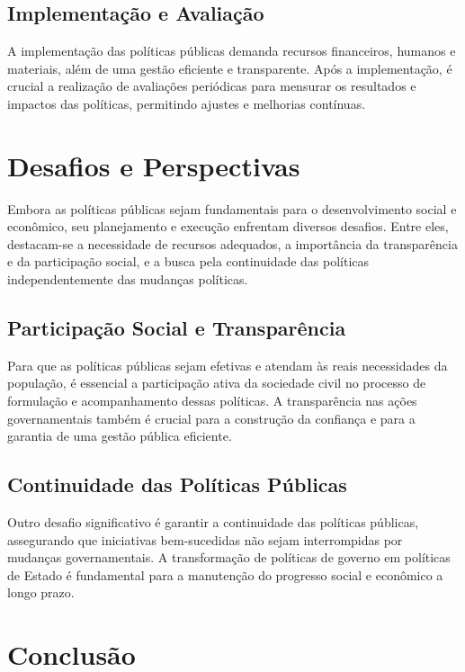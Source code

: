 \documentclass[
   article,       
   12pt,          
   oneside,       
   a4paper,       
   english,       
   brazil,        
   sumario=tradicional
   ]{abntex2}
\begin{document}
\subsection{Implementação e Avaliação}

A implementação das políticas públicas demanda recursos financeiros, humanos e materiais, além de uma gestão eficiente e transparente. Após a implementação, é crucial a realização de avaliações periódicas para mensurar os resultados e impactos das políticas, permitindo ajustes e melhorias contínuas.

\section{Desafios e Perspectivas}

Embora as políticas públicas sejam fundamentais para o desenvolvimento social e econômico, seu planejamento e execução enfrentam diversos desafios. Entre eles, destacam-se a necessidade de recursos adequados, a importância da transparência e da participação social, e a busca pela continuidade das políticas independentemente das mudanças políticas.

\subsection{Participação Social e Transparência}

Para que as políticas públicas sejam efetivas e atendam às reais necessidades da população, é essencial a participação ativa da sociedade civil no processo de formulação e acompanhamento dessas políticas. A transparência nas ações governamentais também é crucial para a construção da confiança e para a garantia de uma gestão pública eficiente.

\subsection{Continuidade das Políticas Públicas}

Outro desafio significativo é garantir a continuidade das políticas públicas, assegurando que iniciativas bem-sucedidas não sejam interrompidas por mudanças governamentais. A transformação de políticas de governo em políticas de Estado é fundamental para a manutenção do progresso social e econômico a longo prazo.

\section{Conclusão}
\end{document}
